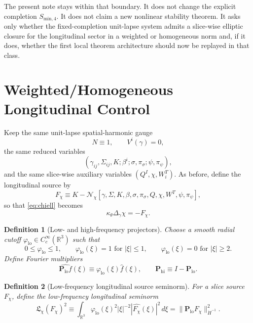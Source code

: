 \documentclass[11pt]{article}
\newtheorem{definition}{Definition}
\begin{document}
The present note stays within that boundary. It does not change the explicit completion \(S_{\mathrm{min},4}\). It does not claim a new nonlinear stability theorem. It asks only whether the fixed-completion unit-lapse system admits a slice-wise elliptic closure for the longitudinal sector in a weighted or homogeneous norm and, if it does, whether the first local theorem architecture should now be replayed in that class.

\section{Weighted/Homogeneous Longitudinal Control}

Keep the same unit-lapse spatial-harmonic gauge
\begin{equation}
N\equiv 1,
\qquad
V^i(\gamma)=0,
\label{eq:gauge}
\end{equation}
the same reduced variables
\begin{equation}
(\gamma_{ij},\Sigma_{ij},K;\beta^i;\sigma,\pi_\sigma;\psi,\pi_\psi),
\label{eq:unknowns}
\end{equation}
and the same slice-wise auxiliary variables \((Q^I,\chi,W_i^T)\). As before, define the longitudinal source by
\begin{equation}
F_\chi
\equiv
K-\mathcal N_\chi[\gamma,\Sigma,K,\beta,\sigma,\pi_\sigma,Q,\chi,W^T,\psi,\pi_\psi],
\label{eq:Fchi}
\end{equation}
so that \eqref{eq:chiell} becomes
\begin{equation}
\kappa_\theta\Delta_\gamma\chi = -F_\chi.
\label{eq:chieq}
\end{equation}

\begin{definition}[Low- and high-frequency projectors]
Choose a smooth radial cutoff \(\varphi_{\mathrm{lo}}\in C_c^\infty(\mathbb R^3)\) such that
\[
0\le \varphi_{\mathrm{lo}}\le 1,
\qquad
\varphi_{\mathrm{lo}}(\xi)=1 \text{ for } |\xi|\le 1,
\qquad
\varphi_{\mathrm{lo}}(\xi)=0 \text{ for } |\xi|\ge 2.
\]
Define Fourier multipliers
\begin{equation}
\widehat{\mathbf P_{\mathrm{lo}}f}(\xi)
\equiv
\varphi_{\mathrm{lo}}(\xi)\widehat f(\xi),
\qquad
\mathbf P_{\mathrm{hi}}\equiv I-\mathbf P_{\mathrm{lo}}.
\label{eq:projectors}
\end{equation}
\end{definition}

\begin{definition}[Low-frequency longitudinal source seminorm]
For a slice source \(F_\chi\), define the \emph{low-frequency longitudinal seminorm}
\begin{equation}
\mathfrak L_\chi(F_\chi)^2
\equiv
\int_{\mathbb R^3}
\varphi_{\mathrm{lo}}(\xi)^2
|\xi|^{-2}
|\widehat{F_\chi}(\xi)|^2\,d\xi
=
\|\mathbf P_{\mathrm{lo}}F_\chi\|_{\dot H^{-1}}^2.
\label{eq:Lchi}
\end{equation}
\end{definition}
\end{document}
